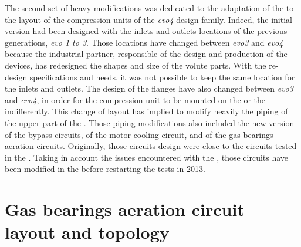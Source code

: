 The second set of heavy modifications was dedicated to the adaptation
of the \BWP{} to the layout of the compression units of the
\textit{evo4} design family. Indeed, the \BWP{} initial version had
been designed with the inlets and outlets locations of the previous
generations, \textit{evo 1 to 3}. Those locations have changed between
\textit{evo3} and \textit{evo4} because the industrial partner,
responsible of the design and production of the devices, has
redesigned the shapes and size of the volute parts. With the re-design
specifications and needs, it was not possible to keep the same
location for the inlets and outlets. The design of the flanges have
also changed between \textit{evo3} and \textit{evo4}, in order for the
compression unit to be mounted on the \BWP{} or the \AWP{}
indifferently. This change of layout has implied to modify heavily the
piping of the upper part of the \BWP{}. Those piping modifications also
included the new version of the bypass circuits, of the motor cooling
circuit, and of the gas
bearings aeration circuits. Originally, those circuits design were close to the
circuits tested in the \AWP{}. Taking in account the issues
encountered with the \AWP{}, those circuits have been modified in the
\BWP{} before restarting the tests in 2013.

\section{Gas bearings aeration circuit layout and topology}
\label{sec:bwp-aeration-details}

